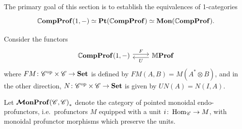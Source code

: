\documentclass[12pt,oneside,article,draft]{memoir}
\begin{document}
The primary goal of this section is to establish the equivalences of 1-categories
\begin{equation}\label{eqn:primary goal}
   \begin{tikzcd}
      \dCompProf(1,-) \equiv \Pt(\dCompProf) \equiv \Mon(\dCompProf).
   \end{tikzcd}
\end{equation}

Consider the functors
\begin{equation}\label{eqn:functors 1C CC}
\begin{tikzcd}
   \dCompProf(1,-) \ar[r,shift left,"F"]
   & \dMProf \ar[l,shift left,"U"]
\end{tikzcd}
\end{equation}
where $FM\colon{\mathscr{C}}^{\text{op}}\times\mathscr{C}\to\mathbf{Set}$ is defined by $FM(A,B)=M(A^*\otimes B)$, and in the
other direction, $N\colon{\mathscr{C}}^{\text{op}}\times\mathscr{C}\to\mathbf{Set}$ is given by $UN(A)=N(I,A)$.

Let $\bm{\mathcal{M}}\mathbf{onProf}{(\mathscr{C},\mathscr{C})}_{\ast}$ denote the category of pointed monoidal endo-profunctors,
i.e.~profunctors $M$ equipped with a unit $i\colon\operatorname{Hom}_{\mathscr{C}}\to M$, with monoidal profunctor
morphisms which preserve the units.
\end{document}
